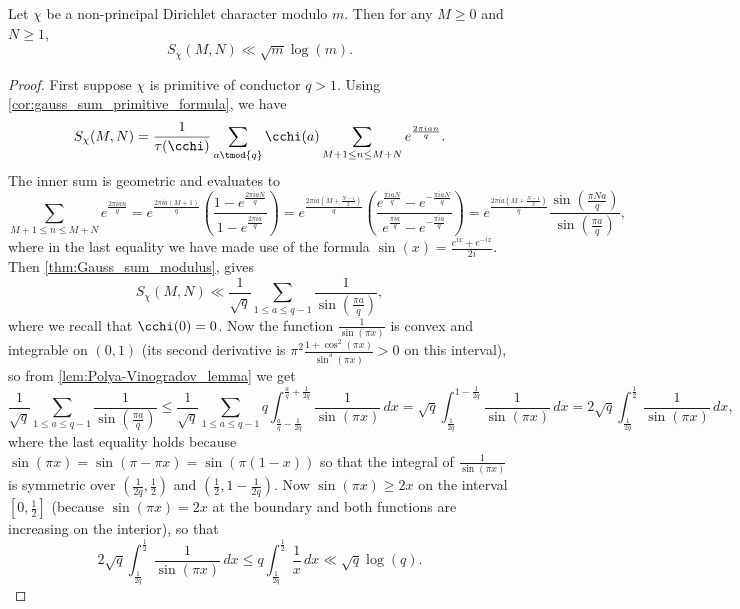     \begin{theorem*}
      Let \(\chi\) be a non-principal Dirichlet character modulo \(m\). Then for any \(M \ge 0\) and \(N \ge 1\),
      \[
        S_{\chi}(M,N) \ll \sqrt{m}\log(m).
      \]
    \end{theorem*}
    \begin{proof}
      First suppose \(\chi\) is primitive of conductor \(q > 1\). Using \cref{cor:gauss_sum_primitive_formula}, we have
      \[
        S_{\chi}(M,N) = \frac{1}{\tau(\cchi)}\sum_{a \tmod{q}}\cchi(a)\sum_{M+1 \le n \le M+N}e^{\frac{2\pi ian}{q}}.
      \]
      The inner sum is geometric and evaluates to
      \[
        \sum_{M+1 \le n \le M+N}e^{\frac{2\pi ian}{q}} = e^{\frac{2\pi ia(M+1)}{q}}\left(\frac{1-e^{\frac{2\pi iaN}{q}}}{1-e^{\frac{2\pi ia}{q}}}\right) = e^{\frac{2\pi ia\left(M+\frac{N-1}{2}\right)}{q}}\left(\frac{e^{\frac{\pi iaN}{q}}-e^{-\frac{\pi iaN}{q}}}{e^{\frac{\pi ia}{q}}-e^{-\frac{\pi ia}{q}}}\right) = e^{\frac{2\pi ia\left(M+\frac{N-1}{2}\right)}{q}}\frac{\sin\left(\frac{\pi Na}{q}\right)}{\sin\left(\frac{\pi a}{q}\right)},
      \]
      where in the last equality we have made use of the formula \(\sin(x) = \frac{e^{ix}+e^{-ix}}{2i}\). Then \cref{thm:Gauss_sum_modulus}, gives
      \[
        S_{\chi}(M,N) \ll \frac{1}{\sqrt{q}}\sum_{1 \le a \le q-1}\frac{1}{\sin\left(\frac{\pi a}{q}\right)},
      \]
      where we recall that \(\cchi(0) = 0\). Now the function \(\frac{1}{\sin(\pi x)}\) is convex and integrable on \((0,1)\) (its second derivative is \(\pi^{2}\frac{1+\cos^{2}(\pi x)}{\sin^{3}(\pi x)} > 0\) on this interval), so from \cref{lem:Polya-Vinogradov_lemma} we get
      \[
        \frac{1}{\sqrt{q}}\sum_{1 \le a \le q-1}\frac{1}{\sin\left(\frac{\pi a}{q}\right)} \le \frac{1}{\sqrt{q}}\sum_{1 \le a \le q-1}q\int_{\frac{a}{q}-\frac{1}{2q}}^{\frac{a}{q}+\frac{1}{2q}}\frac{1}{\sin(\pi x)}\,dx = \sqrt{q}\int_{\frac{1}{2q}}^{1-\frac{1}{2q}}\frac{1}{\sin(\pi x)}\,dx = 2\sqrt{q}\int_{\frac{1}{2q}}^{\frac{1}{2}}\frac{1}{\sin(\pi x)}\,dx,
      \]
      where the last equality holds because \(\sin(\pi x) = \sin(\pi-\pi x) = \sin(\pi(1-x))\) so that the integral of \(\frac{1}{\sin(\pi x)}\) is symmetric over \(\left(\frac{1}{2q},\frac{1}{2}\right)\) and \(\left(\frac{1}{2},1-\frac{1}{2q}\right)\). Now \(\sin(\pi x) \ge 2x\) on the interval \([0,\frac{1}{2}]\) (because \(\sin(\pi x) = 2x\) at the boundary and both functions are increasing on the interior), so that
      \[
        2\sqrt{q}\int_{\frac{1}{2q}}^{\frac{1}{2}}\frac{1}{\sin(\pi x)}\,dx \le q\int_{\frac{1}{2q}}^{\frac{1}{2}}\frac{1}{x}\,dx \ll \sqrt{q}\log(q).
\]
\end{proof}
